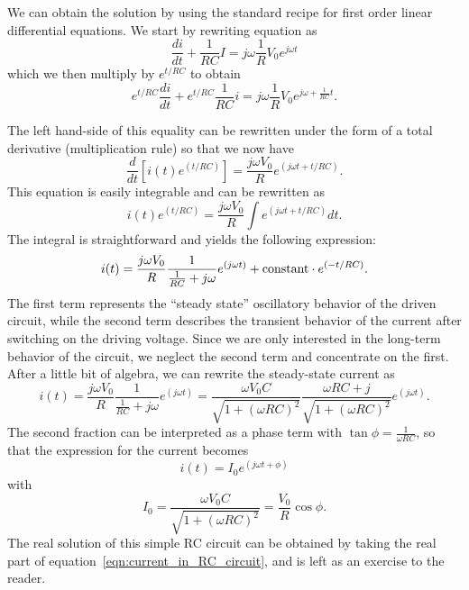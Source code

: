 \documentclass{article}
\begin{document}
We can obtain the solution by using the standard recipe for first order linear differential equations. We start by rewriting equation as
\begin{equation}
\frac{di}{dt} + \frac{1}{R C} I = j \omega \frac{1}{R} V_0 e^{j \omega t}
\end{equation}
which we then multiply by $e^{t/RC}$ to obtain
\begin{equation}
e^{t/RC} \frac{di}{dt} + e^{t/RC} \frac{1}{R C} i = j \omega \frac{1}{R} V_0 e^{j \omega + \frac{1}{RC} t}.
\end{equation}

The left hand-side of this equality can be rewritten under the form of a total derivative (multiplication rule) so that we now have
\begin{equation}
\frac{d}{dt}\left[ i(t) e^{\left(t/RC\right)}\right] = \frac{j\omega V_0}{R} e^{\left( j\omega t + t/RC \right)}.
\end{equation}
This equation is easily integrable and can be rewritten as
\begin{equation}
i(t) e^{\left(t/RC\right)} = \frac{j\omega V_0}{R} \int e^{\left(j\omega t + t/RC\right)} dt.
\end{equation}
The integral is straightforward and yields the following expression:
\begin{equation}
i(t) = \frac{j\omega V_0}{R} \frac{1}{\frac{1}{RC} + j\omega} e^{\left(j\omega t\right)} + \hbox{constant} \cdot e^{\left( -t/RC \right)}.
\end{equation}
The first term represents the ``steady state'' oscillatory behavior of the driven circuit, while the second term describes the transient behavior of the current after switching on the driving voltage. Since we are only interested in the long-term behavior of the circuit, we neglect the second term and concentrate on the first. After a little bit of algebra, we can rewrite the steady-state current as
\begin{equation}
i(t) = \frac{j\omega V_0}{R} \frac{1}{\frac{1}{RC} + j\omega} e^{\left(j\omega t\right)} = \frac{\omega V_0 C}{\sqrt{1 + (\omega RC)^2}} \frac{\omega RC + j}{\sqrt{1 + (\omega RC)^2}} e^{\left(j\omega t\right)}.
\end{equation}
The second fraction can be interpreted as a phase term with $\tan\phi = \frac{1}{\omega RC}$, so that the expression for the current becomes
\begin{equation}
i(t) = I_0 e^{\left(j\omega t + \phi\right)}
\label{eqn:current_in_RC_circuit}
\end{equation}
with
\begin{equation}
I_0 = \frac{\omega V_0 C}{\sqrt{1 + \left(\omega RC\right)^2}} = \frac{V_0}{R} \cos\phi.
\end{equation}
The real solution of this simple RC circuit can be obtained by taking the real part of equation~\ref{eqn:current_in_RC_circuit}, and is left as an exercise to the reader.
\end{document}
